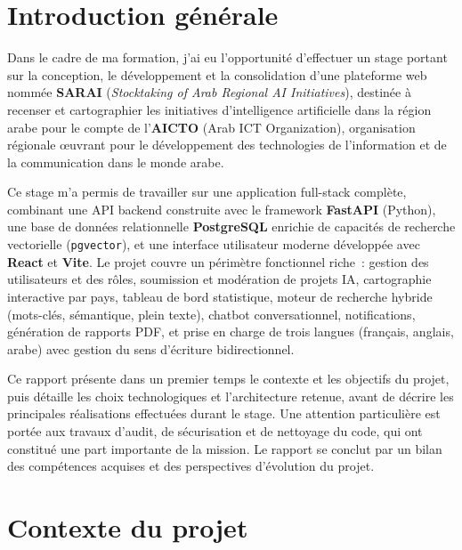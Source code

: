 \documentclass[11pt,a4paper]{report}
\begin{document}
\renewcommand{\contentsname}{Sommaire}
\tableofcontents
\clearpage

\chapter{Introduction générale}

Dans le cadre de ma formation, j'ai eu l'opportunité d'effectuer un stage portant sur la conception, le
développement et la consolidation d'une plateforme web nommée \textbf{SARAI} (\emph{Stocktaking of Arab
Regional AI Initiatives}), destinée à recenser et cartographier les initiatives d'intelligence artificielle
dans la région arabe pour le compte de l'\textbf{AICTO} (Arab ICT Organization), organisation régionale
œuvrant pour le développement des technologies de l'information et de la communication dans le monde arabe.

Ce stage m'a permis de travailler sur une application full-stack complète, combinant une API backend
construite avec le framework \textbf{FastAPI} (Python), une base de données relationnelle
\textbf{PostgreSQL} enrichie de capacités de recherche vectorielle (\texttt{pgvector}), et une interface
utilisateur moderne développée avec \textbf{React} et \textbf{Vite}. Le projet couvre un périmètre
fonctionnel riche~: gestion des utilisateurs et des rôles, soumission et modération de projets IA,
cartographie interactive par pays, tableau de bord statistique, moteur de recherche hybride (mots-clés,
sémantique, plein texte), chatbot conversationnel, notifications, génération de rapports PDF, et prise en
charge de trois langues (français, anglais, arabe) avec gestion du sens d'écriture bidirectionnel.

Ce rapport présente dans un premier temps le contexte et les objectifs du projet, puis détaille les choix
technologiques et l'architecture retenue, avant de décrire les principales réalisations effectuées durant
le stage. Une attention particulière est portée aux travaux d'audit, de sécurisation et de nettoyage du
code, qui ont constitué une part importante de la mission. Le rapport se conclut par un bilan des
compétences acquises et des perspectives d'évolution du projet.

\chapter{Contexte du projet}
\end{document}
